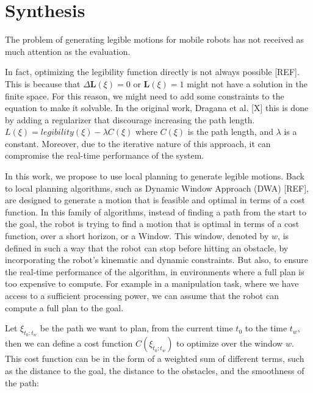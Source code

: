 
\section{Synthesis}

The problem of generating legible motions for mobile robots has not received as much attention as the evaluation.

In fact, optimizing the legibility function directly is not always possible [REF].
This is because that $\Delta \mathbf{L}(\xi) = 0$ or $\mathbf{L}(\xi) = 1$ might not have a solution in the finite space.
For this reason, we might need to add some constraints to the equation to make it solvable.
In the original work, Dragana et al. [X] this is done by adding a regularizer that discourage increasing the path length.
$L(\xi) = legibility(\xi) - \lambda C(\xi)$
where $C(\xi)$ is the path length, and $\lambda$ is a constant.
Moreover, due to the iterative nature of this approach, it can compromise the real-time performance of the system.


In this work, we propose to use local planning to generate legible motions.
Back to local planning algorithms, such as Dynamic Window Approach (DWA) [REF], are designed to generate a motion that is feasible and optimal in terms of a cost function.
%
In this family of algorithms, instead of finding a path from the start to the goal,
the robot is trying to find a motion that is optimal in terms of a cost function, over a short horizon, or a Window.
This window, denoted by $w$, is defined in such a way that the robot can stop before hitting an obstacle,
by incorporating the robot's kinematic and dynamic constraints.
But also, to ensure the real-time performance of the algorithm, in environments where a full plan is too expensive to compute.
For example in a manipulation task, where we have access to a sufficient processing power,
we can assume that the robot can compute a full plan to the goal.

Let $\xi_{t_0:t_w}$ be the path we want to plan, from the current time $t_0$ to the time $t_w$, then we can define a cost function $C(\xi_{t_0:t_w})$ to optimize over the window $w$.
This cost function can be in the form of a weighted sum of different terms, such as the distance to the goal, the distance to the obstacles, and the smoothness of the path:

